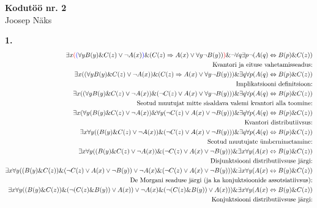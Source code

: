 \documentclass{article}
\begin{document}
\begin{center}
\Large\textbf{Kodut\"o\"o nr. 2}\\
Joosep N\"aks
\end{center}
\textbf{1.} 
\begin{equation*}
\begin{aligned}
\exists x\color{red}(\color{blue}(\color{black}\forall y B(y)\&C(z)\vee\neg A(x)\color{blue})\color{black}\&(C(z)\Rightarrow A(x)\vee\forall y\neg B(y))\color{red})\color{black}\&\neg\forall q\exists p\neg(A(q)\Leftrightarrow B(p)\&C(z))\\
\text{Kvantori ja eituse vahetamisseadus:}\\
\exists x((\forall y B(y)\&C(z)\vee\neg A(x))\&(C(z)\Rightarrow A(x)\vee\forall y\neg B(y)))\&\exists q\forall p(A(q)\Leftrightarrow B(p)\&C(z))\\
\text{Implikatsiooni definitsioon:}\\
\exists x((\forall y B(y)\&C(z)\vee\neg A(x))\&(\neg C(z)\vee A(x)\vee\forall y\neg B(y)))\&\exists q\forall p(A(q)\Leftrightarrow B(p)\&C(z))\\
\text{Seotud muutujat mitte sisaldava valemi kvantori alla toomine:}\\
\exists x(\forall y (B(y)\&C(z)\vee\neg A(x))\&\forall y(\neg C(z)\vee A(x)\vee\neg B(y)))\&\exists q\forall p(A(q)\Leftrightarrow B(p)\&C(z))\\
\text{Kvantori distributiivsus:}\\
\exists x\forall y ((B(y)\&C(z)\vee\neg A(x))\&(\neg C(z)\vee A(x)\vee\neg B(y)))\&\exists q\forall p(A(q)\Leftrightarrow B(p)\&C(z))\\
\text{Seotud muutujate \"umbernimetamine:}\\
\exists x\forall y ((B(y)\&C(z)\vee\neg A(x))\&(\neg C(z)\vee A(x)\vee\neg B(y)))\&\exists x\forall y(A(x)\Leftrightarrow B(y)\&C(z))\\
\text{Disjunktsiooni distributiivsuse j\"argi:}\\
\exists x\forall y ((B(y)\&C(z))\&(\neg C(z)\vee A(x)\vee\neg B(y))\vee\neg A(x)\&(\neg C(z)\vee A(x)\vee\neg B(y)))\&\exists x\forall y(A(x)\Leftrightarrow B(y)\&C(z))\\
\text{De Morgani seaduse j\"argi (ja ka konjuktsioonide assotsiatiivsus):}\\
\exists x\forall y ((B(y)\&C(z))\&(\neg (C(z)\& B(y))\vee A(x))\vee\neg A(x)\&(\neg(C(z)\& B(y))\vee A(x)))\&\exists x\forall y(A(x)\Leftrightarrow B(y)\&C(z))\\
\text{Konjuktsiooni distributiivsuse j\"argi:}\\

\end{aligned}
\end{equation*}
\end{document}
